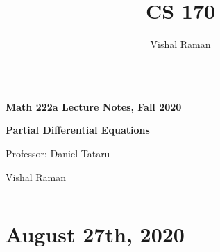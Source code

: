 \documentclass[11pt]{scrartcl}
\begin{document}
\title{CS 170}
\author{Vishal Raman}
\thispagestyle{empty}
$ $
\vfill
\begin{center}

\centerline{\huge \textbf{Math 222a Lecture Notes, Fall 2020}}
\centerline{\Large \textbf{Partial Differential Equations} } 
\centerline{Professor: Daniel Tataru}
\centerline{Vishal Raman}
\end{center}
\vfill
$ $
\newpage
\thispagestyle{empty}
\tableofcontents
\newpage
\section{August 27th, 2020}
\end{document}
